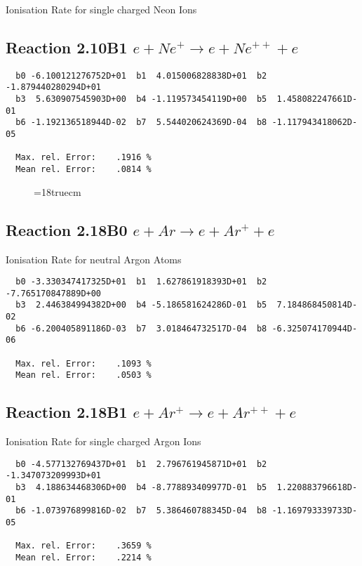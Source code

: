  Ionisation Rate for single charged Neon Ions

\subsection{
Reaction 2.10B1  $ e + Ne^+ \rightarrow e + Ne^{++} + e $
}

\begin{verbatim}
  b0 -6.100121276752D+01  b1  4.015006828838D+01  b2 -1.879440280294D+01
  b3  5.630907545903D+00  b4 -1.119573454119D+00  b5  1.458082247661D-01
  b6 -1.192136518944D-02  b7  5.544020624369D-04  b8 -1.117943418062D-05

  Max. rel. Error:    .1916 %
  Mean rel. Error:    .0814 %

\end{verbatim}


\begin{figure} \label{2.10B0}
\epsfxsize=18truecm
\end{figure}

\newpage

\subsection{
Reaction 2.18B0   $e + Ar  \rightarrow e + Ar^+  + e$
}

  Ionisation Rate for neutral Argon Atoms

\begin{verbatim}
  b0 -3.330347417325D+01  b1  1.627861918393D+01  b2 -7.765170847889D+00
  b3  2.446384994382D+00  b4 -5.186581624286D-01  b5  7.184868450814D-02
  b6 -6.200405891186D-03  b7  3.018464732517D-04  b8 -6.325074170944D-06

  Max. rel. Error:    .1093 %
  Mean rel. Error:    .0503 %

\end{verbatim}



\subsection{
Reaction 2.18B1   $e + Ar^+ \rightarrow e + Ar^{++} + e$
}

  Ionisation Rate for single charged Argon Ions

\begin{verbatim}
  b0 -4.577132769437D+01  b1  2.796761945871D+01  b2 -1.347073209993D+01
  b3  4.188634468306D+00  b4 -8.778893409977D-01  b5  1.220883796618D-01
  b6 -1.073976899816D-02  b7  5.386460788345D-04  b8 -1.169793339733D-05

  Max. rel. Error:    .3659 %
  Mean rel. Error:    .2214 %

\end{verbatim}


